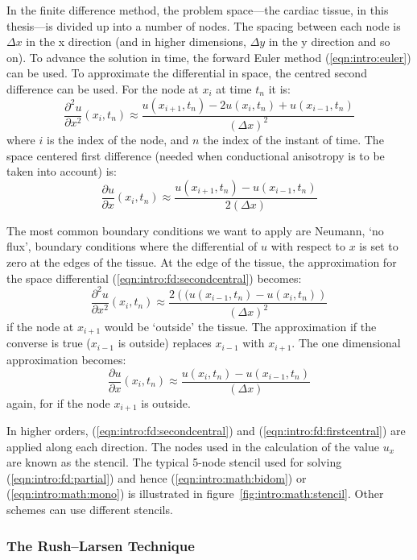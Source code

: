 In the finite difference method, the problem space---the cardiac tissue, in this
thesis---is divided up into a number of nodes.
The spacing between each node is $\Delta x$ in the x direction (and in higher
dimensions,  $\Delta y$ in the y direction and so on).
To advance the solution in time, the forward Euler method
(\ref{eqn:intro:euler}) can be used.
To approximate the differential in space, the centred second difference can be
used.
For the node at $x_i$ at time $t_n$ it is:
\begin{equation}
\label{eqn:intro:fd:secondcentral}
\frac{\partial^2 u}{\partial x^2}\left(x_i, t_n\right) \approx \frac{u(x_{i+1},t_n) - 2u(x_{i},t_n) + u(x_{i-1},t_n) }{\left(\Delta x\right)^2}
\end{equation}
where $i$ is the index of the node, and $n$ the index of the instant of time.
The space centered first difference (needed when conductional anisotropy is to
be taken into account) is:
\begin{equation}
\label{eqn:intro:fd:firstcentral}
\frac{\partial u}{\partial x}\left(x_i, t_n\right) \approx \frac{u(x_{i+1},t_n) - u(x_{i-1},t_n) }{2\left(\Delta x\right)}
\end{equation}

The most common boundary conditions we want to apply are Neumann, `no flux',
boundary conditions where the differential of $u$ with respect to $x$ is set to
zero at the edges of the tissue.
At the edge of the tissue, the approximation for the space differential
(\ref{eqn:intro:fd:secondcentral}) becomes:
\begin{equation}
\label{eqn:intro:fd:secondcentralboundary}
\frac{\partial^2 u}{\partial x^2}\left(x_i, t_n\right) \approx \frac{2\left((u(x_{i-1},t_n) - u(x_{i},t_n) \right)  }{\left(\Delta x\right)^2}
\end{equation}
if the node at $x_{i+1}$ would be `outside' the tissue.
The approximation if the converse is true ($x_{i-1}$ is outside) replaces
$x_{i-1}$ with $x_{i+1}$.
The one dimensional approximation becomes:
\begin{equation}
\label{eqn:intro:fd:firstcentralboundary}
\frac{\partial u}{\partial x}\left(x_i, t_n\right) \approx \frac{u(x_{i},t_n) - u(x_{i-1},t_n) }{\left(\Delta x\right)}
\end{equation}
again, for if the node $x_{i+1}$ is outside.

In higher orders, (\ref{eqn:intro:fd:secondcentral}) and
(\ref{eqn:intro:fd:firstcentral}) are applied along each direction.
The nodes used in the calculation of the value $u_x$ are known as the stencil.
The typical 5-node stencil used for solving (\ref{eqn:intro:fd:partial}) and
hence (\ref{eqn:intro:math:bidom}) or (\ref{eqn:intro:math:mono}) is illustrated
in figure~\ref{fig:intro:math:stencil}.
Other schemes can use different stencils.


\subsubsection{The Rush--Larsen Technique}



